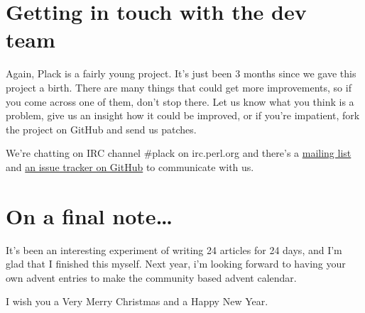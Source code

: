 \section{Getting in touch with the dev
team}\label{getting-in-touch-with-the-dev-team}

Again, Plack is a fairly young project. It's just been 3 months since we
gave this project a birth. There are many things that could get more
improvements, so if you come across one of them, don't stop there. Let
us know what you think is a problem, give us an insight how it could be
improved, or if you're impatient, fork the project on GitHub and send us
patches.

We're chatting on IRC channel \#plack on irc.perl.org and there's a
\href{http://groups.google.com/group/psgi-plack}{mailing list} and
\href{http://github.com/plack/Plack/issues}{an issue tracker on GitHub}
to communicate with us.

\section{On a final note\ldots{}}\label{on-a-final-note}

It's been an interesting experiment of writing 24 articles for 24 days,
and I'm glad that I finished this myself. Next year, i'm looking forward
to having your own advent entries to make the community based advent
calendar.

I wish you a Very Merry Christmas and a Happy New Year.
